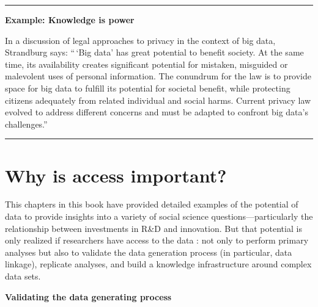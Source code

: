 \documentclass[]{krantz}
\begin{document}
\begin{center}\rule{0.5\linewidth}{\linethickness}\end{center}

\textbf{Example: Knowledge is power}

In a discussion of legal approaches to privacy in the context of big
data, Strandburg \citeyearpar{Strandburg2014} says: ``\,`Big data' has
great potential to benefit society. At the same time, its availability
creates significant potential for mistaken, misguided or malevolent uses
of personal information. The conundrum for the law is to provide space
for big data to fulfill its potential for societal benefit, while
protecting citizens adequately from related individual and social harms.
Current privacy law evolved to address different concerns and must be
adapted to confront big data's challenges.''

\begin{center}\rule{0.5\linewidth}{\linethickness}\end{center}

\section{Why is access important?}\label{why-is-access-important}

This chapters in this book have provided detailed examples of the
potential of data to provide insights into a variety of social science
questions---particularly the relationship between investments in R\&D
and innovation. But that potential is only realized if researchers have
access to the data \citep{Lane2007}: not only to perform primary
analyses but also to validate the data generation process (in
particular, data linkage), replicate analyses, and build a knowledge
infrastructure around complex data sets.

\textbf{Validating the data generating process}
\end{document}
